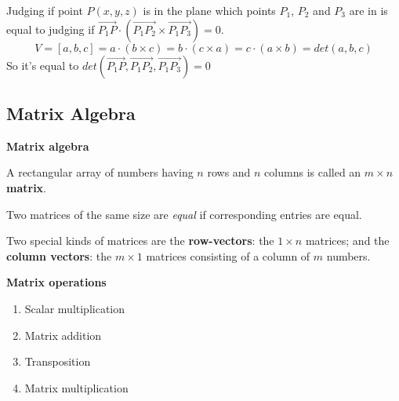 \documentclass{article}
\begin{document}
Judging if point $P(x, y, z)$ is in the plane which points $P_1$, $P_2$ and $P_3$ are in is equal to judging if $\overrightarrow{P_1P} \cdot (\overrightarrow{P_1P_2} \times \overrightarrow{P_1P_3}) = 0$.
$$V = \left[ a, b, c \right] = a \cdot (b \times c) = b \cdot (c \times a) = c \cdot (a \times b) = det(a, b, c)$$
So it's equal to $det(\overrightarrow{P_1P}, \overrightarrow{P_1P_2}, \overrightarrow{P_1P_3}) = 0$

\subsection{Matrix Algebra}
\textbf{Matrix algebra}

A rectangular array of numbers having $n$ rows and $n$ columns is called an $m × n$ \textbf{matrix}.

Two matrices of the same size are \textit{equal} if corresponding entries are equal.

Two special kinds of matrices are the \textbf{row-vectors}: the $1 \times n$ matrices; and the \textbf{column vectors}: the $m \times 1$ matrices consisting of a column of $m$ numbers.

\textbf{Matrix operations}
\begin{enumerate}
  \item Scalar multiplication
  \item Matrix addition
  \item Transposition
  \item Matrix multiplication
\end{enumerate}
\end{document}

